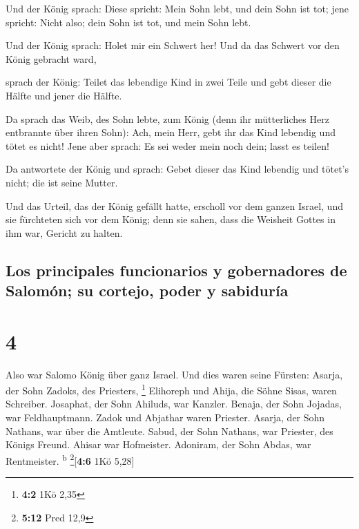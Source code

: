  Und der König sprach: Diese spricht: Mein Sohn lebt, und
dein Sohn ist tot; jene spricht: Nicht also; dein Sohn ist tot, und mein
Sohn lebt.

 Und der König sprach: Holet mir ein Schwert her! Und da
das Schwert vor den König gebracht ward,

 sprach der König: Teilet das lebendige Kind in zwei
Teile und gebt dieser die Hälfte und jener die Hälfte.

 Da sprach das Weib, des Sohn lebte, zum König (denn ihr
mütterliches Herz entbrannte über ihren Sohn): Ach, mein Herr, gebt ihr
das Kind lebendig und tötet es nicht! Jene aber sprach: Es sei weder
mein noch dein; lasst es teilen!

 Da antwortete der König und sprach: Gebet dieser das
Kind lebendig und tötet's nicht; die ist seine Mutter.

 Und das Urteil, das der König gefällt hatte, erscholl
vor dem ganzen Israel, und sie fürchteten sich vor dem König; denn sie
sahen, dass die Weisheit Gottes in ihm war, Gericht zu halten.

\hypertarget{los-principales-funcionarios-y-gobernadores-de-salomuxf3n-su-cortejo-poder-y-sabiduruxeda}{%
\subsection{Los principales funcionarios y gobernadores de Salomón; su
cortejo, poder y
sabiduría}\label{los-principales-funcionarios-y-gobernadores-de-salomuxf3n-su-cortejo-poder-y-sabiduruxeda}}

\hypertarget{section-3}{%
\section{4}\label{section-3}}

 Also war Salomo König über ganz Israel. 
Und dies waren seine Fürsten: Asarja, der Sohn Zadoks, des Priesters,
\footnote{\textbf{4:2} 1Kö 2,35}  Elihoreph und Ahija, die
Söhne Sisas, waren Schreiber. Josaphat, der Sohn Ahiluds, war Kanzler.
 Benaja, der Sohn Jojadas, war Feldhauptmann. Zadok und
Abjathar waren Priester.  Asarja, der Sohn Nathans, war
über die Amtleute. Sabud, der Sohn Nathans, war Priester, des Königs
Freund.  Ahisar war Hofmeister. Adoniram, der Sohn Abdas,
war Rentmeister. \textsuperscript{b} \footnote{\textbf{5:12} Pred 12,9}{[}\textbf{4:6}
1Kö 5,28{]}

